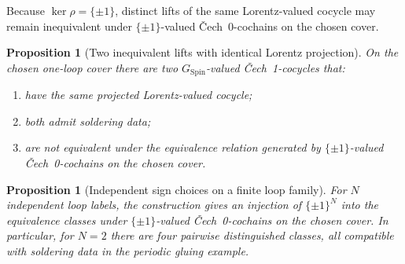 \documentclass[11pt,a4paper]{article}
\newtheorem{proposition}[theorem]{Proposition}
\theoremstyle{definition}
\theoremstyle{remark}
\newcommand{\SpinG}{G_{\mathrm{Spin}}}
\newcommand{\Cech}{\ifmmode\text{\v{C}ech}\else\v{C}ech\fi}
\begin{document}
Because \(\ker\rho=\{\pm1\}\), distinct lifts of the same Lorentz-valued cocycle may remain inequivalent under \(\{\pm1\}\)-valued \Cech\ 0-cochains on the chosen cover.

\begin{proposition}[Two inequivalent lifts with identical Lorentz projection]
\label{prop:one-loop-freedom}
On the chosen one-loop cover there are two \(\SpinG\)-valued \Cech\ 1-cocycles that:
\begin{enumerate}
\item have the same projected Lorentz-valued cocycle;
\item both admit soldering data;
\item are not equivalent under the equivalence relation generated by \(\{\pm1\}\)-valued \Cech\ 0-cochains on the chosen cover.
\end{enumerate}
\end{proposition}

\begin{proposition}[Independent sign choices on a finite loop family]
\label{prop:multi-loop}
For \(N\) independent loop labels, the construction gives an injection of
\(\{\pm1\}^{N}\) into the equivalence classes under \(\{\pm1\}\)-valued \Cech\ 0-cochains on the chosen cover.  In particular, for
\(N=2\) there are four pairwise distinguished classes, all compatible with soldering data in the periodic gluing example.
\end{proposition}
\end{document}
